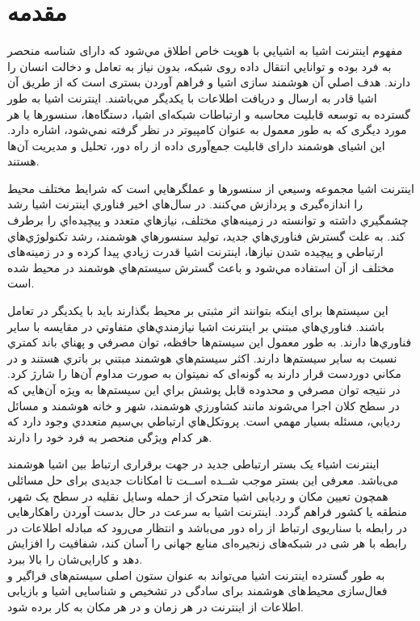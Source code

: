 \chapter{مقدمه}
مفهوم اينترنت اشيا  به اشيايي با هويت خاص اطلاق مي‌شود كه دارای شناسه منحصر به فرد بوده و توانايي انتقال داده روی شبکه، بدون نياز به تعامل و دخالت انسان را دارند. هدف اصلي آن هوشمند سازی اشيا و فراهم آوردن بستری است كه از طريق آن اشيا قادر به ارسال و دريافت اطلاعات با يکديگر مي‌باشند. اينترنت اشيا به طور گسترده به توسعه قابليت محاسبه و ارتباطات شبکه‌ای اشيا، دستگاه‌ها، سنسورها يا هر مورد ديگری كه به طور معمول به عنوان كامپيوتر در نظر گرفته نمي‌شود، اشاره دارد. اين اشيای هوشمند دارای قابليت جمع‌آوری داده از راه دور، تحليل و مديريت آن‌ها هستند. \cite{Mukhtar2015}


اینترنت اشیا مجموعه وسيعي از سنسورها و عملگرهايي است كه شرايط مختلف محیط را اندازه‌گیری و پردازش مي‌كنند. در سال‌هاي اخير فناوري اينترنت اشيا رشد چشمگيري داشته و توانسته در زمينه‌هاي مختلف، نيازهاي متعدد و پيچيده‌اي را برطرف كند. به علت گسترش فناوري‌هاي جديد، توليد سنسورهاي هوشمند، رشد تكنولوژي‌هاي ارتباطي و پيچيده شدن نيازها، اينترنت اشيا قدرت زيادي پيدا كرده و در زمینه‌های مختلف از آن استفاده مي‌شود و باعث گسترش سيستم‌هاي هوشمند در محیط شده است. \cite{Shah2016}


 این سیستم‌ها برای اینکه بتوانند اثر مثبتی بر محیط بگذارند باید با یکدیگر در تعامل باشند. فناوري‌هاي مبتني بر اينترنت اشيا نيازمندي‌هاي متفاوتي در مقايسه با ساير فناوري‌ها دارند. به طور معمول اين سيستم‌ها حافظه، توان مصرفي و پهناي باند كمتري نسبت به ساير سيستم‌ها دارند. اكثر سيستم‌هاي هوشمند مبتني بر باتري هستند و در مكاني دوردست قرار دارند به گونه‌ای كه نمیتوان به صورت مداوم آن‌ها را شارژ كرد. در نتيجه توان مصرفي و محدوده قابل پوشش براي اين سيستم‌ها به ويژه آن‌هايي كه در سطح كلان اجرا مي‌شوند مانند كشاورزي هوشمند، شهر و خانه هوشمند و مسائل رديابي، مسئله بسيار مهمي است. پروتكل‌هاي ارتباطي بي‌سيم متعددي وجود دارد كه هر كدام ويژگی منحصر به فرد خود را دارند.


اینترنت اشیاء یک بستر ارتباطی جدید در جهت برقراری ارتباط بین اشیا هوشمند می‌باشد. معرفی این بستر موجب شــده اســت تا امکانات جدیدی برای حل مسائلی همچون تعیین مکان و ردیابی اشیا متحرک از حمله وسایل نقلیه در سطح یک شهر، منطقه یا کشور فراهم گردد. اینترنت اشیا به سرعت در حال بدست آوردن راهکارهایی در رابطه با سناریوی ارتباط از راه دور می‌باشد و انتظار می‌رود که مبادله اطلاعات در رابطه با هر شی در شبکه‌های زنجیره‌ای منابع جهانی را آسان کند، شفافیت را افزایش دهد و کارایی‌شان را بالا ببرد. \\
به طور گسترده اینترنت اشیا می‌تواند به عنوان ستون اصلی سیستم‌های فراگیر و فعال‌سازی محیط‌های هوشمند برای سادگی در تشخیص و شناسایی اشیا و بازیابی اطلاعات از اینترنت در هر زمان و در هر مکان به کار برده شود.


